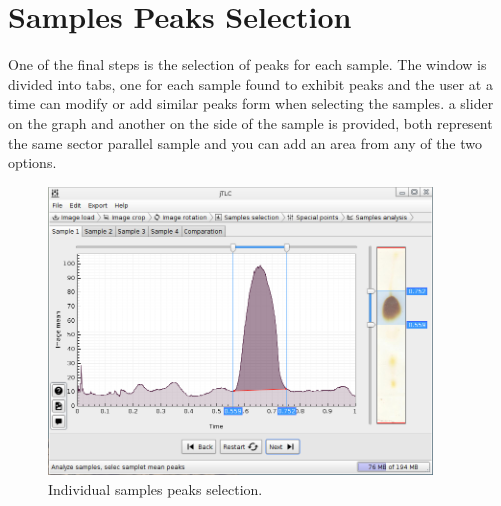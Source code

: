 \section{Samples Peaks Selection}
One of the final steps is the selection of peaks for each sample. The window is divided into tabs, one for each sample found to exhibit peaks and the user at a time can modify or add similar peaks form when selecting the samples. a slider on the graph and another on the side of the sample is provided, both represent the same sector parallel sample and you can add an area from any of the two options.
\begin{figure}[H]
	\vspace{0cm}
	\centering
	\includegraphics[width=385px]{imagenes/analysis}
	\centering
	\vspace{-0.4cm}
	\caption{Individual samples peaks selection.}
	\label{fig:image_samples_peaks}
	\vspace{-0.25cm}
\end{figure}
\newpage

